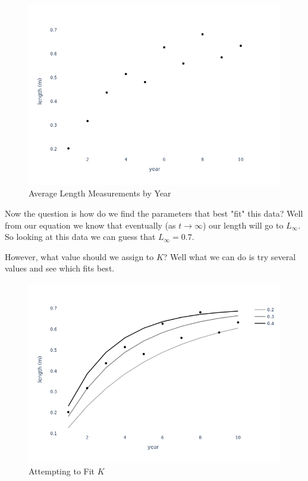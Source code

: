 \documentclass[11pt,a5paper]{book}
\begin{document}
\begin{figure}[H] 
  \includegraphics[scale=0.35]{notebooks/Fitting/new_measurements.png}
  \caption{Average Length Measurements by Year}
  \label{fig:length_measurements_by_year}
\end{figure}

Now the question is how do we find the parameters that best "fit" this data? Well from our equation we know that eventually (as $t \rightarrow \infty$) our length will go to $L_\infty$. So looking at this data we can guess that $L_\infty = 0.7$.  
\newline

However, what value should we assign to $K$? Well what we can do is try several values and see which fits best.

\begin{figure}[H] 
  \includegraphics[width=\linewidth]{notebooks/Fitting/fit_lines.png}
  \caption{Attempting to Fit $K$}
  \label{fig:fitting_K}
\end{figure}
\end{document}

